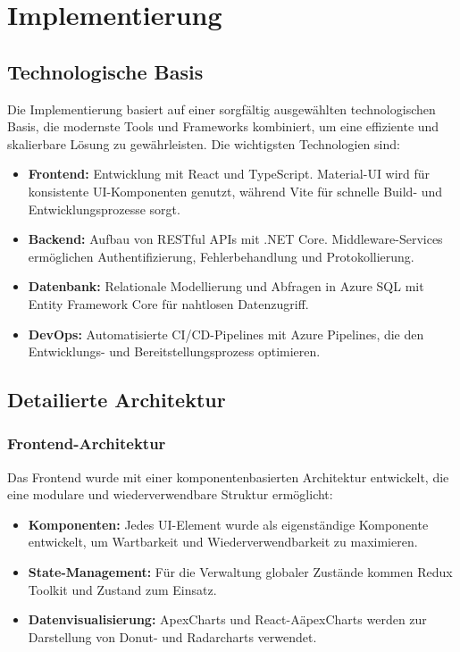 \chapter{Implementierung}
\label{chap:implementierung}

\section{Technologische Basis}
Die Implementierung basiert auf einer sorgfältig ausgewählten technologischen Basis, die modernste Tools und Frameworks kombiniert, um eine effiziente und skalierbare Lösung zu gewährleisten. Die wichtigsten Technologien sind:
\begin{itemize}
    \item \textbf{Frontend:} Entwicklung mit React und TypeScript. Material-UI wird für konsistente UI-Komponenten genutzt, während Vite für schnelle Build- und Entwicklungsprozesse sorgt.
    \item \textbf{Backend:} Aufbau von RESTful APIs mit .NET Core. Middleware-Services ermöglichen Authentifizierung, Fehlerbehandlung und Protokollierung.
    \item \textbf{Datenbank:} Relationale Modellierung und Abfragen in Azure SQL mit Entity Framework Core für nahtlosen Datenzugriff.
    \item \textbf{DevOps:} Automatisierte CI/CD-Pipelines mit Azure Pipelines, die den Entwicklungs- und Bereitstellungsprozess optimieren.
\end{itemize}

\section{Detailierte Architektur}
\subsection{Frontend-Architektur}
Das Frontend wurde mit einer komponentenbasierten Architektur entwickelt, die eine modulare und wiederverwendbare Struktur ermöglicht:
\begin{itemize}
    \item \textbf{Komponenten:} Jedes UI-Element wurde als eigenständige Komponente entwickelt, um Wartbarkeit und Wiederverwendbarkeit zu maximieren.
    \item \textbf{State-Management:} Für die Verwaltung globaler Zustände kommen Redux Toolkit und Zustand zum Einsatz.
    \item \textbf{Datenvisualisierung:} ApexCharts und React-AäpexCharts werden zur Darstellung von Donut- und Radarcharts verwendet.
\end{itemize}

